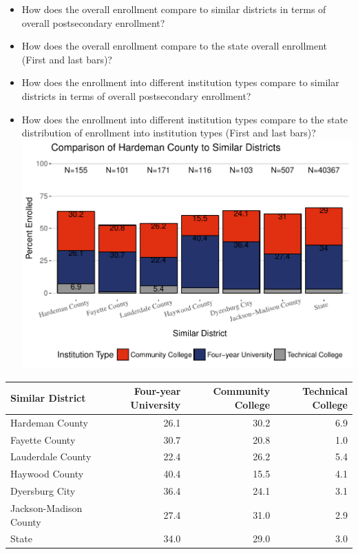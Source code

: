 \documentclass[11pt,]{article}
\providecommand{\tightlist}{%
  \setlength{\itemsep}{0pt}\setlength{\parskip}{0pt}}
\begin{document}
\begin{itemize}
\tightlist
\item
  How does the overall enrollment compare to similar districts in terms
  of overall postsecondary enrollment?\\
\item
  How does the overall enrollment compare to the state overall
  enrollment (First and last bars)?\\
\item
  How does the enrollment into different institution types compare to
  similar districts in terms of overall postsecondary enrollment?\\
\item
  How does the enrollment into different institution types compare to
  the state distribution of enrollment into institution types (First and
  last bars)?\\
  \includegraphics{20170511_PSWRR_files/figure-latex/comparison_districts-1.pdf}
\end{itemize}

\begin{longtable}[]{@{}lrrr@{}}
\toprule
Similar District & Four-year University & Community College & Technical
College\tabularnewline
\midrule
\endhead
Hardeman County & 26.1 & 30.2 & 6.9\tabularnewline
Fayette County & 30.7 & 20.8 & 1.0\tabularnewline
Lauderdale County & 22.4 & 26.2 & 5.4\tabularnewline
Haywood County & 40.4 & 15.5 & 4.1\tabularnewline
Dyersburg City & 36.4 & 24.1 & 3.1\tabularnewline
Jackson-Madison County & 27.4 & 31.0 & 2.9\tabularnewline
State & 34.0 & 29.0 & 3.0\tabularnewline
\bottomrule
\end{longtable}
\end{document}
